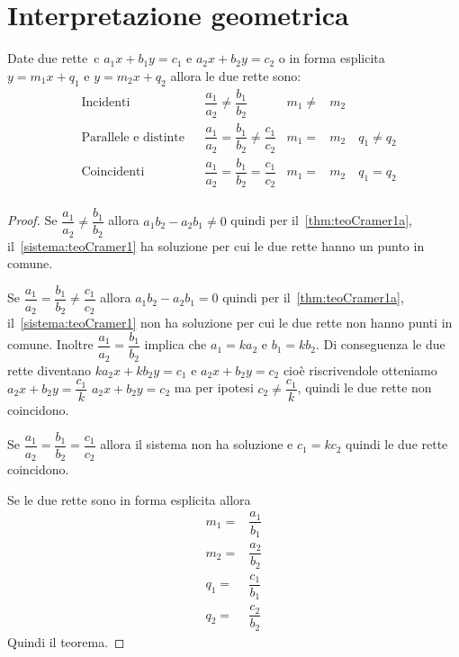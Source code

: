 \section{Interpretazione geometrica}
\begin{thm}
	Date due rette~\cite{Zwirner1988}c $a_1x+b_1y=c_1$ e $a_2x+b_2y=c_2$ o in forma esplicita $y=m_1x+q_1$ e $y=m_2x+q_2$ allora le due rette sono:
\begin{align*}
&\text{Incidenti}&&\dfrac{a_1}{a_2}\neq\dfrac{b_1}{b_2}&m_1\neq& m_2\\
&\text{Parallele e distinte}&&\dfrac{a_1}{a_2}=\dfrac{b_1}{b_2}\neq\dfrac{c_1}{c_2}&m_1=& m_2\quad q_1\neq q_2\\
&\text{Coincidenti}&&\dfrac{a_1}{a_2}=\dfrac{b_1}{b_2}=\dfrac{c_1}{c_2}&m_1=& m_2\quad q_1= q_2\\
\end{align*}
\end{thm}
\begin{proof}
Se $\dfrac{a_1}{a_2}\neq\dfrac{b_1}{b_2}$ allora $a_1b_2-a_2b_1\neq 0$ quindi per il~\cref{thm:teoCramer1a}, il~\cref{sistema:teoCramer1} ha soluzione per cui le due rette hanno un punto in comune.

Se $\dfrac{a_1}{a_2}=\dfrac{b_1}{b_2}\neq\dfrac{c_1}{c_2}$ allora $a_1b_2-a_2b_1= 0$ quindi per il~\cref{thm:teoCramer1a}, il~\cref{sistema:teoCramer1} non ha soluzione per cui le due rette non hanno punti in comune. Inoltre $\dfrac{a_1}{a_2}=\dfrac{b_1}{b_2}$ implica che $a_1=ka_2$ e $b_1=kb_2$. Di conseguenza le due rette diventano $ka_2x+kb_2y=c_1$ e $a_2x+b_2y=c_2$ cioè riscrivendole otteniamo $a_2x+b_2y=\dfrac{c_1}{k}$ $a_2x+b_2y=c_2$ ma per ipotesi $c_2\neq\dfrac{c_1}{k}$, quindi le due rette non coincidono.

Se $\dfrac{a_1}{a_2}=\dfrac{b_1}{b_2}=\dfrac{c_1}{c_2}$ allora il sistema non ha soluzione e $c_1=kc_2$ quindi le  due rette coincidono.

Se le due rette sono in forma esplicita allora 
\begin{align*}
m_1=&\dfrac{a_1}{b_1}\\
m_2=&\dfrac{a_2}{b_2}\\
q_1=&\dfrac{c_1}{b_1}\\
q_2=&\dfrac{c_2}{b_2}
\end{align*} 
Quindi il teorema.
\end{proof}